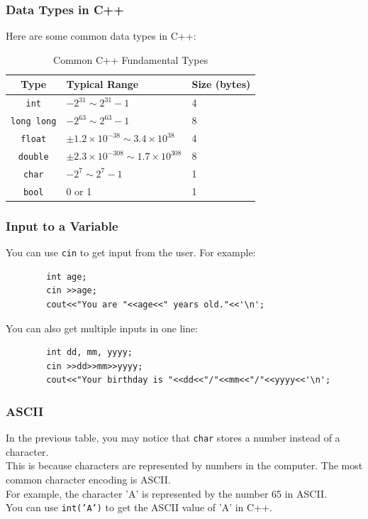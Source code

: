 \documentclass[xcolor=dvipsnames]{beamer}
\begin{document}
    \begin{frame}
        \frametitle{Data Types in C++}
        Here are some common data types in C++:
        \begin{table}[h]
        \centering
        \caption{Common C++ Fundamental Types}
        \begin{tabular}{cll}
        \toprule
        \textbf{Type} & \textbf{Typical Range} & \textbf{Size (bytes)} \\
        \midrule
        \texttt{int}        & $-2^{31}\sim 2^{31}-1$ & 4 \\
        \texttt{long long}  & $-2^{63}\sim 2^{63}-1$ & 8 \\
        \texttt{float}      & $\pm 1.2 \times 10^{-38}\sim 3.4 \times 10^{38}$ & 4 \\
        \texttt{double}     & $\pm 2.3 \times 10^{-308}\sim 1.7 \times 10^{308}$ & 8 \\
        \texttt{char}       & $-2^7\sim 2^7-1$ & 1 \\
        \texttt{bool}     & 0 or 1 & 1 \\
        \bottomrule
        \end{tabular}
        \end{table}        
    \end{frame}

    \begin{frame}[fragile]
        \frametitle{Input to a Variable}
        You can use \texttt{cin} to get input from the user. For example:
        \begin{verbatim}
        int age;
        cin >>age;
        cout<<"You are "<<age<<" years old."<<'\n';
        \end{verbatim}
        You can also get multiple inputs in one line:
        \begin{verbatim}
        int dd, mm, yyyy;
        cin >>dd>>mm>>yyyy;
        cout<<"Your birthday is "<<dd<<"/"<<mm<<"/"<<yyyy<<'\n';
        \end{verbatim}
    \end{frame}

    \begin{frame}
        \frametitle{ASCII}
        In the previous table, you may notice that \texttt{char} stores a number instead of a character.\\
        This is because characters are represented by numbers in the computer. The most common character encoding is ASCII.\\
        For example, the character 'A' is represented by the number 65 in ASCII.\\
        You can use \texttt{int('A')} to get the ASCII value of 'A' in C++.
    \end{frame}
\end{document}
